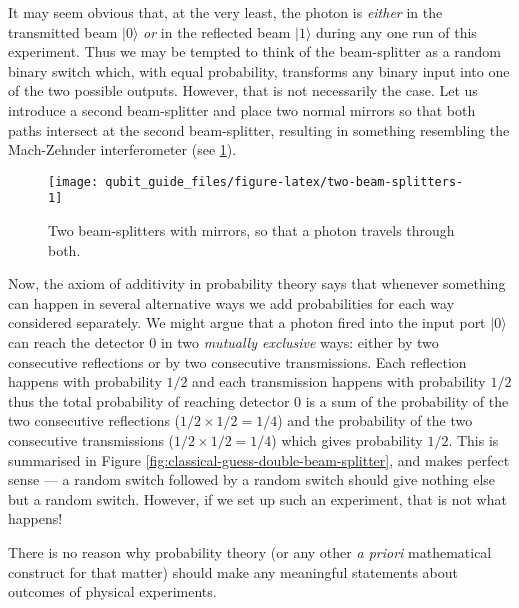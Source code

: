 \documentclass[fleqn]{article}
\newenvironment{idea}{\noindent}{\medskip}
\begin{document}
It may seem obvious that, at the very least, the photon is \emph{either} in the transmitted beam \(|0\rangle\) \emph{or} in the reflected beam \(|1\rangle\) during any one run of this experiment.
Thus we may be tempted to think of the beam-splitter as a random binary switch which, with equal probability, transforms any binary input into one of the two possible outputs.
However, that is not necessarily the case.
Let us introduce a second beam-splitter and place two normal mirrors so that both paths intersect at the second beam-splitter, resulting in something resembling the Mach-Zehnder interferometer (see \ref{fig:two-beam-splitters}).

\begin{figure}[H]

{\centering \texttt{[image: qubit\_guide\_files/figure-latex/two-beam-splitters-1]} 

}

\caption{Two beam-splitters with mirrors, so that a photon travels through both.}\label{fig:two-beam-splitters}
\end{figure}

Now, the axiom of additivity in probability theory says that whenever something can happen in several alternative ways we add probabilities for each way considered separately.
We might argue that a photon fired into the input port \(|0\rangle\) can reach the detector \(0\) in two \emph{mutually exclusive} ways: either by two consecutive reflections or by two consecutive transmissions.
Each reflection happens with probability \(1/2\) and each transmission happens with probability \(1/2\) thus the total probability of reaching detector 0 is a sum of the probability of the two consecutive reflections (\(1/2\times 1/2 = 1/4\)) and the probability of the two consecutive transmissions (\(1/2\times 1/2 = 1/4\)) which gives probability \(1/2\).
This is summarised in Figure \ref{fig:classical-guess-double-beam-splitter}, and makes perfect sense --- a random switch followed by a random switch should give nothing else but a random switch.
However, if we set up such an experiment, that is not what happens!

\begin{idea}
There is no reason why probability theory (or any other \emph{a priori} mathematical construct for that matter) should make any meaningful statements about outcomes of physical experiments.

\end{idea}
\end{document}
